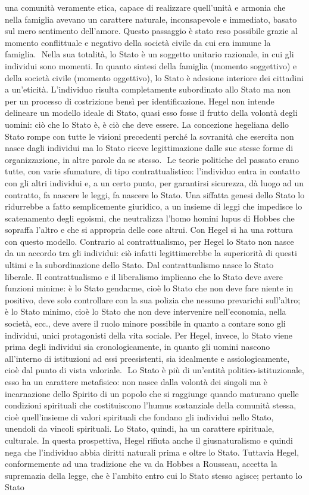 \documentclass[a4paper,12pt,oneside,openany]{book}%
\begin{document}
una comunità veramente etica, capace di realizzare quell’unità e armonia che nella famiglia avevano un carattere naturale, inconsapevole e immediato, basato sul mero sentimento dell’amore. Questo passaggio è stato reso possibile grazie al momento conflittuale e negativo della società civile da cui era immune la famiglia.  Nella sua totalità, lo Stato è un soggetto unitario razionale, in cui gli individui sono momenti. In quanto sintesi della famiglia (momento soggettivo) e della società civile (momento oggettivo), lo Stato è adesione interiore dei cittadini a un’eticità. L’individuo risulta completamente subordinato allo Stato ma non per un processo di costrizione bensì per identificazione. Hegel non intende delineare un modello ideale di Stato, quasi esso fosse il frutto della volontà degli uomini: ciò che lo Stato è, è ciò che deve essere. La concezione hegeliana dello Stato rompe con tutte le visioni precedenti perché la sovranità che esercita non nasce dagli individui ma lo Stato riceve legittimazione dalle sue stesse forme di organizzazione, in altre parole da se stesso.  Le teorie politiche del passato erano tutte, con varie sfumature, di tipo contrattualistico: l’individuo entra in contatto con gli altri individui e, a un certo punto, per garantirsi sicurezza, dà luogo ad un contratto, fa nascere le leggi, fa nascere lo Stato. Una siffatta genesi dello Stato lo ridurrebbe a fatto semplicemente giuridico, a un insieme di leggi che impedisce lo scatenamento degli egoismi, che neutralizza l’homo homini lupus di Hobbes che  sopraffa l’altro e che si appropria delle cose altrui. Con Hegel si ha una rottura con questo modello. Contrario al contrattualismo, per Hegel lo Stato non nasce da un accordo tra gli individui: ciò infatti legittimerebbe la superiorità di questi ultimi e la subordinazione dello Stato. Dal contrattualismo nasce lo Stato liberale. Il contrattualismo e il liberalismo implicano che lo Stato deve avere funzioni minime: è lo Stato gendarme, cioè lo Stato che non deve fare niente in positivo, deve solo controllare con la sua polizia che nessuno prevarichi sull’altro; è lo Stato minimo, cioè lo Stato che non deve intervenire nell’economia, nella società, ecc., deve avere il ruolo minore possibile in quanto a contare sono gli individui, unici protagonisti della vita sociale. Per Hegel, invece, lo Stato viene prima degli individui sia cronologicamente, in quanto gli uomini nascono all’interno di istituzioni ad essi preesistenti, sia idealmente e assiologicamente, cioè dal punto di vista valoriale.  Lo Stato è più di un’entità politico-istituzionale, esso ha un carattere metafisico: non nasce dalla volontà dei singoli ma è incarnazione dello Spirito di un popolo che si raggiunge quando maturano quelle condizioni spirituali che costituiscono l’humus sostanziale della comunità stessa, cioè quell’insieme di valori spirituali che fondano gli individui nello Stato, unendoli da vincoli spirituali. Lo Stato, quindi, ha un carattere spirituale, culturale. In questa prospettiva, Hegel rifiuta anche il giusnaturalismo e quindi nega che l’individuo abbia diritti naturali prima e oltre lo Stato. Tuttavia Hegel, conformemente ad una tradizione che va da Hobbes a Rousseau, accetta la supremazia della legge, che è l’ambito entro cui lo Stato stesso agisce; pertanto lo Stato 
\end{document}
